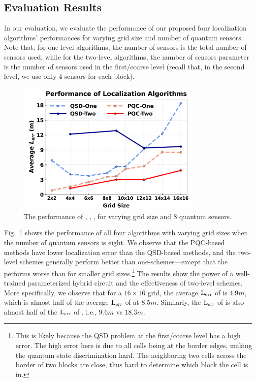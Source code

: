 \subsection{Evaluation Results}
In our evaluation, we evaluate the performance of our proposed four localization algorithms' performances for varying  grid size and number of quantum sensors.
Note that, for one-level algorithms, the number of sensors is the total number of sensors used, while for the two-level algorithms, the number of sensors parameter is the number of sensors used in the first/coarse level (recall that, in the second level, we use only 4 sensors for each block). 
\begin{figure}[ht]
    \centering
    \includegraphics[width=0.8\textwidth]{chapters/qce/figures/continuous.varygrid.png}
    \caption{The performance of \povmone, \povm, \pqcone, \pqctwo for varying grid size and 8 quantum sensors.}
    \label{fig:continuous.varygrid}
\end{figure}

 Fig.~\ref{fig:continuous.varygrid} shows the performance of all four algorithms with varying grid sizes when the number of quantum sensors is eight. 
We observe that the PQC-based methods have lower localization error than the QSD-based methods, and
the two-level schemes generally perform better than one-schemes---except that the \povm performs worse than \povmone for smaller grid sizes.\footnote{This is likely because the QSD problem at the first/coarse level has a high error. 
The high error here is due to all cells being at the border edges, making the quantum state discrimination hard.
The neighboring two cells across the border of two blocks are close, thus hard to determine which block the cell is in.}
The results show the power of a well-trained parameterized hybrid circuit and the effectiveness of two-level schemes. 
More specifically, we observe that for a $16\times16$ grid, the average $\mathrm{L_{err}}$ of \pqctwo is $4.9 m$, which is almost half of the average $\mathrm{L_{err}}$ of \pqcone at $8.5m$.
Similarly, the $\mathrm{L_{err}}$ of \povm is also almost half of the $\mathrm{L_{err}}$ of \povmone, i.e., $9.6m$ vs $18.3m$.

